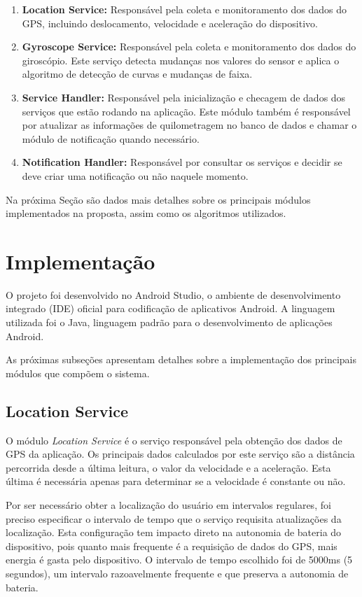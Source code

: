 \begin{enumerate}
  \item \textbf{Location Service:} Responsável pela coleta e monitoramento dos dados do GPS, incluindo deslocamento, velocidade e
  aceleração do dispositivo.
  \item \textbf{Gyroscope Service:} Responsável pela coleta e monitoramento dos dados do giroscópio. Este serviço detecta mudanças
  nos valores do sensor e aplica o algoritmo de detecção de curvas e mudanças de faixa.
  \item \textbf{Service Handler:} Responsável pela inicialização e checagem de dados dos serviços
  que estão rodando na aplicação. Este módulo também é responsável por atualizar as informações
  de quilometragem no banco de dados e chamar o módulo de notificação quando necessário.
  \item \textbf{Notification Handler:} Responsável por consultar os serviços e decidir se deve criar uma notificação ou não naquele
  momento.
\end{enumerate}

Na próxima Seção são dados mais detalhes sobre os principais módulos implementados na proposta, assim como os algoritmos utilizados.

\section{Implementação}
\label{sec-implementacao}

O projeto foi desenvolvido no Android Studio, o ambiente de desenvolvimento integrado (IDE) oficial para
codificação de aplicativos Android. A linguagem utilizada foi o Java, linguagem padrão para o desenvolvimento
de aplicações Android.

As próximas subseções apresentam detalhes sobre a implementação dos principais módulos que compõem o sistema.

\subsection{Location Service}
\label{location-service}

O módulo \textit{Location Service} é o serviço responsável pela obtenção dos dados de GPS da aplicação. Os principais dados calculados
por este serviço são a distância percorrida desde a última leitura, o valor da velocidade e a aceleração. Esta última é necessária
apenas para determinar se a velocidade é constante ou não.

Por ser necessário obter a localização do usuário em intervalos regulares, foi preciso especificar o intervalo de tempo que o
serviço requisita atualizações da localização. Esta configuração tem impacto direto na autonomia de bateria do dispositivo,
pois quanto mais frequente é a requisição de dados do GPS, mais energia é gasta pelo dispositivo. O intervalo de tempo escolhido
foi de 5000ms (5 segundos), um intervalo razoavelmente frequente e que preserva a autonomia de bateria.

